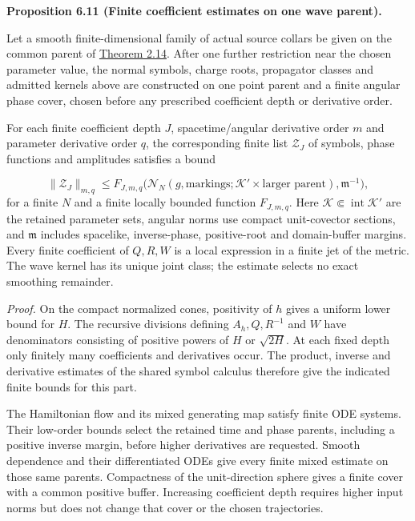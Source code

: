\documentclass[
  english,
  11pt,
  reqno]{amsart}
\makeatletter
\newcommand{\pandocstatementheading}[1]{%
  \par\addpenalty{\@beginparpenalty}%
  \addvspace{.5\baselineskip plus .2\baselineskip minus .2\baselineskip}%
  {\normalfont\bfseries #1\par}%
  \nobreak\@afterindenttrue\@afterheading
}
\makeatother
\begin{document}
\pandocstatementheading{\leavevmode{}\label{prop:online-wave-kernel-finite-families}Proposition 6.11 (Finite coefficient estimates on one wave parent).}

Let a smooth finite-dimensional family of actual source collars be given
on the common parent of
\hyperref[thm:online-common-collar-finite-families]{Theorem 2.14}. After
one further restriction near the chosen parameter value, the normal
symbols, charge roots, propagator classes and admitted kernels above are
constructed on one point parent and a finite angular phase cover, chosen
before any prescribed coefficient depth or derivative order.

For each finite coefficient depth \(J\), spacetime/angular derivative
order \(m\) and parameter derivative order \(q\), the corresponding
finite list \(\mathcal Z_J\) of symbols, phase functions and amplitudes
satisfies a bound

\label{eq:online-wave-kernel-finite-family-bound} \[
\|\mathcal Z_J\|_{m,q}
\le F_{J,m,q}\bigl(
\mathcal N_N(g,\text{markings};\mathcal K'\times\text{larger parent}),
\mathfrak m^{-1}\bigr),
\] for a finite \(N\) and a finite locally bounded function
\(F_{J,m,q}\). Here \(\mathcal K\Subset\operatorname{int}\mathcal K'\)
are the retained parameter sets, angular norms use compact unit-covector
sections, and \(\mathfrak m\) includes spacelike, inverse-phase,
positive-root and domain-buffer margins. Every finite coefficient of
\(Q,R,W\) is a local expression in a finite jet of the metric. The wave
kernel has its unique joint class; the estimate selects no exact
smoothing remainder.

\emph{Proof.} On the compact normalized cones, positivity of \(h\) gives
a uniform lower bound for \(H\). The recursive divisions defining
\(A_h,Q,R^{-1}\) and \(W\) have denominators consisting of positive
powers of \(H\) or \(\sqrt{2H}\). At each fixed depth only finitely many
coefficients and derivatives occur. The product, inverse and derivative
estimates of the shared symbol calculus therefore give the indicated
finite bounds for this part.

The Hamiltonian flow and its mixed generating map satisfy finite ODE
systems. Their low-order bounds select the retained time and phase
parents, including a positive inverse margin, before higher derivatives
are requested. Smooth dependence and their differentiated ODEs give
every finite mixed estimate on those same parents. Compactness of the
unit-direction sphere gives a finite cover with a common positive
buffer. Increasing coefficient depth requires higher input norms but
does not change that cover or the chosen trajectories.
\end{document}
